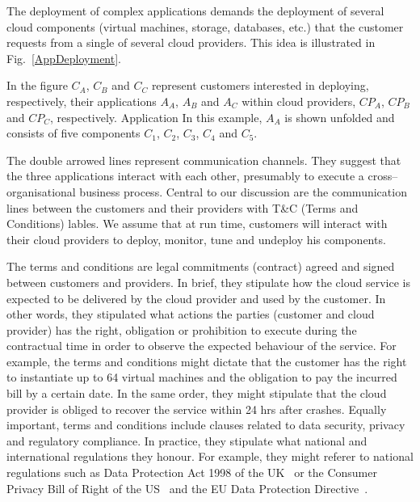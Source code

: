 \documentclass[runningheads,a4paper]{llncs}
\begin{document}
The deployment of complex applications demands the deployment of
several cloud components (virtual machines, storage, databases, etc.) that
the customer requests from a single of several cloud providers. This
idea is illustrated in Fig.~\ref{AppDeployment}.

In the figure $C_A$, $C_B$ and $C_C$ represent customers interested in
deploying, respectively, their applications $A_A$, $A_B$ and $A_C$ within
cloud providers, ${CP}_A$, ${CP}_B$ and ${CP}_C$, respectively. Application
In this example, $A_A$ is shown unfolded and consists of five components  
$C_1$, $C_2$, $C_3$, $C_4$ and $C_5$. 

The double arrowed lines represent communication channels. They 
suggest that the three applications interact with each other,
presumably to execute a cross--organisational business process.
Central to our discussion are the communication lines between
the customers and their providers with T\&C (Terms and Conditions)
lables. We assume that at run time, customers will interact with
their cloud providers to deploy, monitor, tune and undeploy
his components. 


The terms and conditions are legal commitments (contract) agreed
and signed between customers and providers. In brief, they
stipulate how the cloud service is expected to be delivered
by the cloud provider and used by the customer. In other words,
they stipulated what actions the parties (customer and cloud provider)
has the right, obligation or prohibition to execute during the
contractual time in order to observe the expected behaviour
of the service. For example, the terms and conditions might
dictate that the customer has the right to instantiate up
to 64 virtual machines and the obligation to pay the incurred
bill by a certain date. In the same order, they might stipulate
that the cloud provider is obliged to recover the service within
24 hrs after crashes. Equally important, terms and conditions
include clauses related to data security, privacy and 
regulatory compliance. In practice, they stipulate what national
and international regulations they honour.  For example,
they might referer to national regulations such as
Data Protection Act 1998 of the UK~\cite{DPAGuide2014} or the 
Consumer Privacy Bill of Right of the US~\cite{CDP2012} and 
the EU Data Protection Directive~\cite{DPDoct1995}.
  
\end{document}
